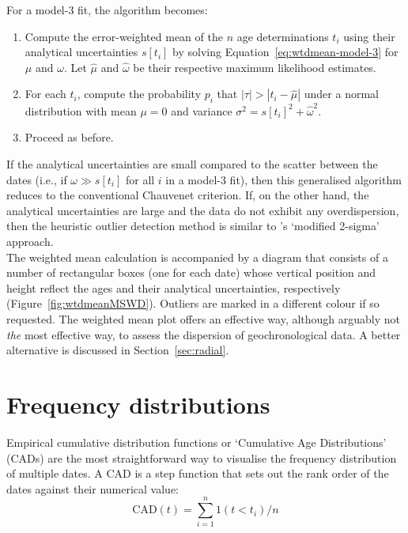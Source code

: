 \begin{refsection}
For a model-3 fit, the algorithm becomes:

\begin{enumerate}
\item Compute the error-weighted mean of the $n$ age determinations
  $t_i$ using their analytical uncertainties $s[t_i]$ by solving
  Equation~\ref{eq:wtdmean-model-3} for $\mu$ and $\omega$. Let
  $\hat{\mu}$ and $\hat{\omega}$ be their respective maximum
  likelihood estimates.
\item For each $t_i$, compute the probability $p_i$ that
  $|\tau|>|t_i-\hat{\mu}|$ under a normal distribution with mean
  $\mu=0$ and variance $\sigma^2=s[t_i]^2+\hat{\omega}^2$.
\item Proceed as before.
\end{enumerate}

If the analytical uncertainties are small compared to the scatter
between the dates (i.e., if $\omega \gg s[t_i]$ for all $i$ in a
model-3 fit), then this generalised algorithm reduces to the
conventional Chauvenet criterion. If, on the other hand, the
analytical uncertainties are large and the data do not exhibit any
overdispersion, then the heuristic outlier detection method is similar
to \citet{ludwig2003}'s `modified 2-sigma' approach.\\

The weighted mean calculation is accompanied by a diagram that
consists of a number of rectangular boxes (one for each date) whose
vertical position and height reflect the ages and their analytical
uncertainties, respectively (Figure~\ref{fig:wtdmeanMSWD}).  Outliers
are marked in a different colour if so requested. The weighted mean
plot offers an effective way, although arguably not \emph{the} most
effective way, to assess the dispersion of geochronological data. A
better alternative is discussed in Section~\ref{sec:radial}.

\section{Frequency distributions}
\label{sec:KDE+CAD}

Empirical cumulative distribution functions or `Cumulative Age
Distributions' (CADs) are the most straightforward way to visualise
the frequency distribution of multiple dates. A CAD is a step function
that sets out the rank order of the dates against their numerical
value:
\begin{equation}
  \mathrm{CAD}(t) = \sum_{i=1}^{n} 1(t<t_i)/n
  \label{eq:CAD}
\end{equation}


\end{refsection}
